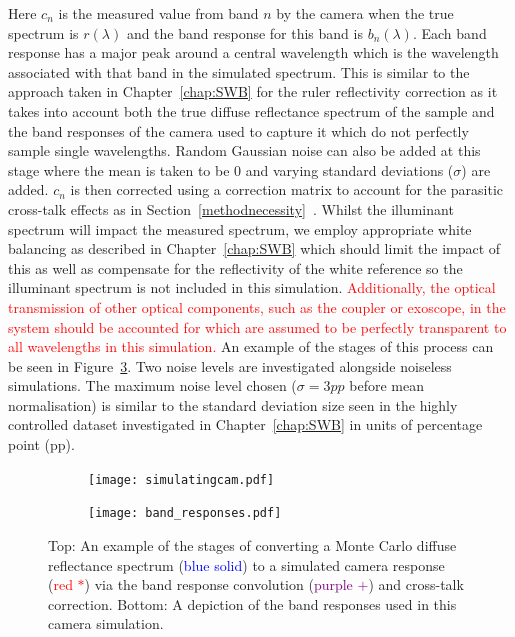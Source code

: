 Here $c_n$ is the measured value from band $n$ by the camera when the true spectrum is $r(\lambda)$ and the band response for this band is $b_n(\lambda)$. Each band response has a major peak around a central wavelength which is the wavelength associated with that band in the simulated spectrum. This is similar to the approach taken in Chapter~\ref{chap:SWB} for the ruler reflectivity correction as it takes into account both the true diffuse reflectance spectrum of the sample and the band responses of the camera used to capture it which do not perfectly sample single wavelengths. Random Gaussian noise can also be added at this stage where the mean is taken to be 0 and varying standard deviations ($\sigma$) are added. $c_n$ is then corrected using a correction matrix to account for the parasitic cross-talk effects as in Section~\ref{methodnecessity}~\citep{Pichette2017}. Whilst the illuminant spectrum will impact the measured spectrum, we employ appropriate white balancing as described in Chapter~\ref{chap:SWB} which should limit the impact of this as well as compensate for the reflectivity of the white reference so the illuminant spectrum is not included in this simulation. \textcolor{red}{Additionally, the optical transmission of other optical components, such as the coupler or exoscope, in the system should be accounted for which are assumed to be perfectly transparent to all wavelengths in this simulation.} An example of the stages of this process can be seen in Figure~\ref{fig:simulatingcam}. %
Two noise levels are investigated alongside noiseless simulations. The maximum noise level chosen ($\sigma = 3pp$ before mean normalisation) is similar to the standard deviation size seen in the highly controlled dataset investigated in Chapter~\ref{chap:SWB} in units of percentage point (pp).  
\begin{figure}[h!]
    \centering 
    \begin{subfigure}{0.7\textwidth}
    \centering
        \texttt{[image: simulatingcam.pdf]}
        \caption{}
        \label{fig:simulatingcamsubfigure}
    \end{subfigure}
    \begin{subfigure}{0.62\textwidth}
        \centering
        \texttt{[image: band\_responses.pdf]}
        \caption{}
        \label{fig:bandresponses}
    \end{subfigure}
    \caption{Top: An example of the stages of converting a Monte Carlo diffuse reflectance spectrum (\textcolor{blue}{blue solid}) to a simulated camera response (\textcolor{red}{red $*$}) via the band response convolution (\textcolor{purple}{purple $+$}) and cross-talk correction. Bottom: A depiction of the band responses used in this camera simulation.}
    \label{fig:simulatingcam}
\end{figure}

